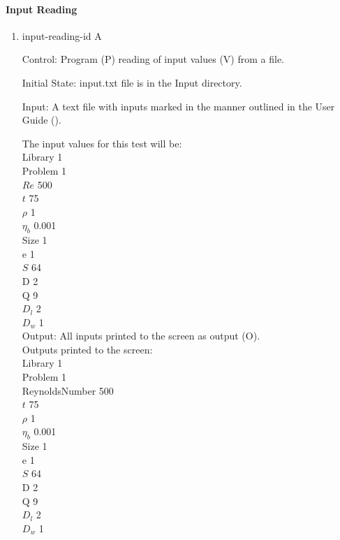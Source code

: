 \documentclass[12pt, titlepage]{article}
\newcounter{testcounter} %
\begin{document}
\paragraph{Input Reading}
\label{inputreading}
\begin{enumerate}

\item{input-reading-id\thetestcounter
    A \label{inputreadingtest}}

  Control: Program (P) reading of input values (V) from a file.
				
  Initial State: input.txt file is in the Input directory. %
					
  Input: A text file with inputs marked in the manner outlined
  in the User Guide (\citet{LBM_UserGuide_PM}).

  The input values for this test will be:\\
  Library 1\\
  Problem 1\\	
  $Re$ 500\\ 
  $t$ 75\\
  $\rho$ 1\\
  $\eta_b$ 0.001\\
  Size 1\\
  $\mathrm{e}$ 1\\
  $S$ 64\\
  $\mathrm{D}$ 2\\
  $\mathrm{Q}$ 9\\
  $D_{l}$ 2\\
  $D_{w}$ 1\\

					
Output: All inputs printed to the screen as output (O).\\
Outputs printed to the screen:\\
Library 1\\
Problem 1\\
ReynoldsNumber 500\\
$t$ 75\\
$\rho$ 1\\
$\eta_b$ 0.001\\
Size 1\\
$\mathrm{e}$ 1\\
$S$ 64\\
$\mathrm{D}$ 2\\
$\mathrm{Q}$ 9\\
$D_{l}$ 2\\
$D_{w}$ 1\\


\end{enumerate}
\end{document}
